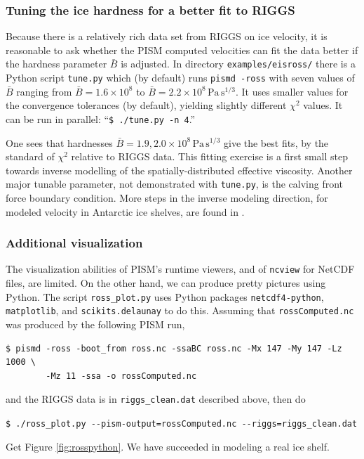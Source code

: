 \documentclass[11pt,final]{amsart}
\renewcommand{\t}[1]{\texttt{#1}}
\begin{document}
\subsubsection*{Tuning the ice hardness for a better fit to RIGGS}  Because there is a relatively rich data set from RIGGS on ice velocity, it is reasonable to ask whether the PISM computed velocities can fit the data better if the hardness parameter $\bar B$ is adjusted.  In directory \verb|examples/eisross/| there is a Python script \verb|tune.py| which (by default) runs \verb|pismd -ross| with seven values of $\bar B$ ranging from $\bar B = 1.6  \times 10^8$ to $\bar B = 2.2 \times 10^8 \, \text{Pa}\, \text{s}^{1/3}$.  It uses smaller values for the convergence tolerances (by default), yielding slightly different $\chi^2$ values.  It can be run in parallel: ``\verb|$ ./tune.py -n 4|.''

One sees that hardnesses $\bar B = 1.9,2.0 \times 10^8 \, \text{Pa}\, \text{s}^{1/3}$ give the best fits, by the standard of $\chi^2$ relative to RIGGS data.  This fitting exercise is a first small step towards inverse modelling of the spatially-distributed effective viscosity.  Another major tunable parameter, not demonstrated with \verb|tune.py|, is the calving front force boundary condition.  More steps in the inverse modeling direction, for modeled velocity in Antarctic ice shelves, are found in \cite{HumbertGreveHutter,RommelaereMacAyeal}.


\subsubsection*{Additional visualization}  The visualization abilities of PISM's runtime viewers, and of \verb|ncview| for NetCDF files, are limited.  On the other hand, we can produce pretty pictures using Python.  The script \verb|ross_plot.py| uses Python packages \verb|netcdf4-python|, \verb|matplotlib|, and \t{scikits.delaunay} to do this.  Assuming that \verb|rossComputed.nc| was produced by the following PISM run,

\begin{verbatim}
$ pismd -ross -boot_from ross.nc -ssaBC ross.nc -Mx 147 -My 147 -Lz 1000 \
        -Mz 11 -ssa -o rossComputed.nc
\end{verbatim}
and the RIGGS data is in \verb|riggs_clean.dat| described above, then do

\verb|$ ./ross_plot.py --pism-output=rossComputed.nc --riggs=riggs_clean.dat|

\noindent Get Figure \ref{fig:rosspython}.  We have succeeded in modeling a real ice shelf.
\end{document}
